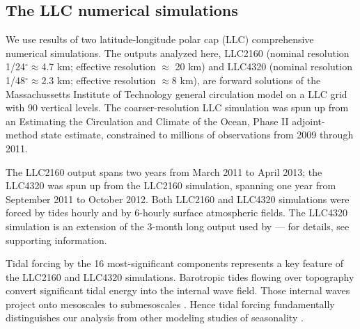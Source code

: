 \documentclass[grl]{agutex2015}
\begin{document}
\begin{article}
\section{The LLC numerical simulations}
We use results of two latitude-longitude polar cap (LLC)
comprehensive numerical simulations. The outputs
analyzed here, LLC2160 (nominal resolution 1/24$^\circ$$\approx$4.7 km;
effective resolution $\approx$ 20 km) and LLC4320
(nominal resolution 1/48$^\circ$$\approx$2.3 km;
effective resolution $\approx$8 km),   are
forward solutions of the Massachussetts Institute of Technology general circulation model \citep[MITgcm; ][]{marshall_etal1997}
on a LLC grid  \citep{forget_etal2015} with
90 vertical levels. The coarser-resolution LLC simulation was
spun up from an Estimating the Circulation and Climate of the Ocean, Phase II \citep[ECCO2; ][]{menemenlis_etal2008}
adjoint-method state estimate, constrained to millions
of observations from 2009 through 2011.

The LLC2160
output spans two years from March 2011 to April 2013; the LLC4320 was spun up from
the LLC2160 simulation, spanning one year from September 2011 to October 2012.
Both LLC2160 and LLC4320 simulations were forced by
tides hourly and by 6-hourly surface atmospheric fields.
The LLC4320 simulation is an extension of the 3-month long output used by
\citet{rocha_etal2016} --- for details, see supporting information.

Tidal forcing by the 16 most-significant components represents a key feature of the LLC2160 and
LLC4320 simulations. Barotropic tides flowing over topography convert significant tidal energy into the internal
wave field. Those internal waves project onto mesoscales to submesoscales
\citep[e.g., ][]{rocha_etal2016}. Hence tidal forcing fundamentally distinguishes our analysis
from other modeling studies of seasonality \citep{sasaki_etal2014,qiu_etal2014}.


\end{article}
\end{document}
